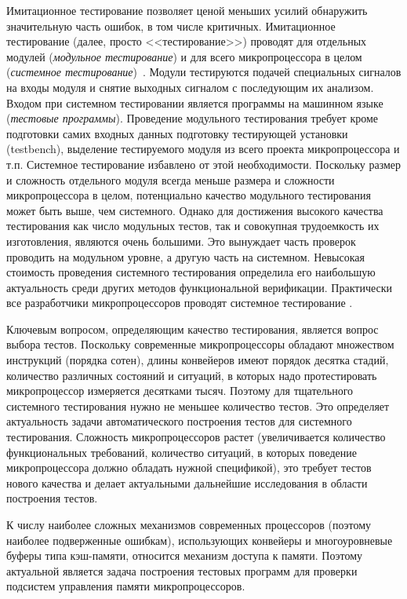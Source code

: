 {Имитационное тестирование позволяет ценой меньших усилий обнаружить значительную часть ошибок, в том числе критичных. Имитационное тестирование (далее, просто <<тестирование>>) проводят для отдельных модулей (\emph{модульное тестирование}) и для всего микропроцессора в целом (\emph{системное тестирование})~\cite{EDAbook}. Модули тестируются подачей специальных сигналов на входы модуля и снятие выходных сигналом с последующим их анализом. Входом при системном тестировании является программы на машинном языке (\emph{тестовые программы}). Проведение модульного тестирования требует кроме подготовки самих входных данных подготовку тестирующей установки (testbench), выделение тестируемого модуля из всего проекта микропроцессора и т.п. Системное тестирование избавлено от этой необходимости. Поскольку размер и сложность отдельного модуля всегда меньше размера и сложности микропроцессора в целом, потенциально качество модульного тестирования может быть выше, чем системного. Однако для достижения высокого качества тестирования как число модульных тестов, так и совокупная трудоемкость их изготовления, являются очень большими. Это вынуждает часть проверок проводить на модульном уровне, а другую часть на системном. Невысокая стоимость проведения системного тестирования определила его наибольшую актуальность среди других методов функциональной верификации. Практически все разработчики микропроцессоров проводят системное тестирование
.

Ключевым вопросом, определяющим качество тестирования, является вопрос выбора тестов. Поскольку современные микропроцессоры обладают множеством инструкций (порядка сотен), длины конвейеров имеют порядок десятка стадий, количество различных состояний и ситуаций, в которых надо протестировать микропроцессор измеряется десятками тысяч. Поэтому для тщательного системного тестирования нужно не меньшее количество тестов. Это определяет актуальность задачи автоматического построения тестов для системного тестирования. Сложность микропроцессоров растет (увеличивается количество функциональных требований, количество ситуаций, в которых поведение микропроцессора должно обладать нужной спецификой), это требует тестов нового качества и делает актуальными дальнейшие исследования в области построения тестов.


К числу наиболее сложных механизмов современных процессоров (поэтому наиболее подверженные ошибкам), использующих конвейеры и многоуровневые буферы типа кэш-памяти, относится механизм доступа к памяти. Поэтому актуальной является задача построения тестовых программ для проверки подсистем управления памяти микропроцессоров.

}
